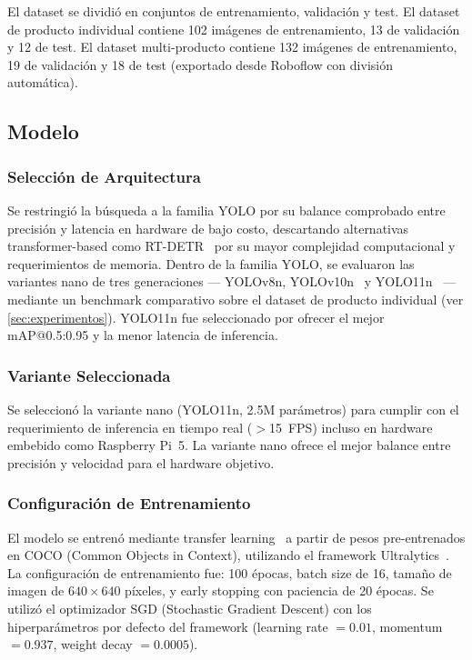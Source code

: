 \documentclass[conference,a4paper]{IEEEtran}[2015/08/26]
\begin{document}
El dataset se dividió en conjuntos de entrenamiento, validación y test. El dataset de producto individual contiene 102 imágenes de entrenamiento, 13 de validación y 12 de test. El dataset multi-producto contiene 132 imágenes de entrenamiento, 19 de validación y 18 de test (exportado desde Roboflow con división automática).

\subsection{Modelo}
\label{subsec:modelo}

\subsubsection{Selección de Arquitectura}

Se restringió la búsqueda a la familia YOLO por su balance comprobado entre precisión y latencia en hardware de bajo costo, descartando alternativas transformer-based como RT-DETR~\cite{zhao2023rtdetr} por su mayor complejidad computacional y requerimientos de memoria. Dentro de la familia YOLO, se evaluaron las variantes nano de tres generaciones --- YOLOv8n, YOLOv10n~\cite{wang2024yolov10} y YOLO11n~\cite{jocher2023ultralytics} --- mediante un benchmark comparativo sobre el dataset de producto individual (ver \cref{sec:experimentos}). YOLO11n fue seleccionado por ofrecer el mejor mAP@0.5:0.95 y la menor latencia de inferencia.

\subsubsection{Variante Seleccionada}

Se seleccionó la variante nano (YOLO11n, 2.5M parámetros) para cumplir con el requerimiento de inferencia en tiempo real ($>$15~FPS) incluso en hardware embebido como Raspberry Pi~5. La variante nano ofrece el mejor balance entre precisión y velocidad para el hardware objetivo.

\subsubsection{Configuración de Entrenamiento}

El modelo se entrenó mediante transfer learning~\cite{yosinski2014transferable} a partir de pesos pre-entrenados en COCO (Common Objects in Context), utilizando el framework Ultralytics~\cite{jocher2023ultralytics}. La configuración de entrenamiento fue: 100 épocas, batch size de 16, tamaño de imagen de $640 \times 640$ píxeles, y early stopping con paciencia de 20 épocas. Se utilizó el optimizador SGD (Stochastic Gradient Descent) con los hiperparámetros por defecto del framework (learning rate $= 0.01$, momentum $= 0.937$, weight decay $= 0.0005$).
\end{document}
